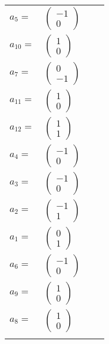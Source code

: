 \documentclass[1p]{elsarticle_modified}
\theoremstyle{definition}
\begin{document}
\begin{tabular}{m{7pt} m{180pt} m{7pt} m{180pt} }
\flushright $a_{5}=$&$\begin{pmatrix}-1\\0\end{pmatrix}$ \\
\flushright $a_{10}=$&$\begin{pmatrix}1\\0\end{pmatrix}$ \\
\flushright $a_{7}=$&$\begin{pmatrix}0\\-1\end{pmatrix}$ \\
\flushright $a_{11}=$&$\begin{pmatrix}1\\0\end{pmatrix}$ \\
\flushright $a_{12}=$&$\begin{pmatrix}1\\1\end{pmatrix}$ \\
\flushright $a_{4}=$&$\begin{pmatrix}-1\\0\end{pmatrix}$ \\
\flushright $a_{3}=$&$\begin{pmatrix}-1\\0\end{pmatrix}$ \\
\flushright $a_{2}=$&$\begin{pmatrix}-1\\1\end{pmatrix}$ \\
\flushright $a_{1}=$&$\begin{pmatrix}0\\1\end{pmatrix}$ \\
\flushright $a_{6}=$&$\begin{pmatrix}-1\\0\end{pmatrix}$ \\
\flushright $a_{9}=$&$\begin{pmatrix}1\\0\end{pmatrix}$ \\
\flushright $a_{8}=$&$\begin{pmatrix}1\\0\end{pmatrix}$\\&\end{tabular}
\end{document}
